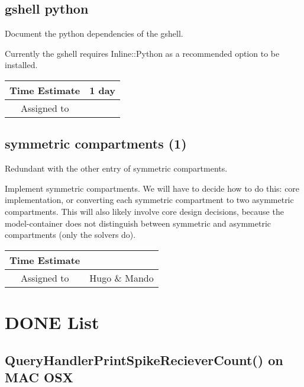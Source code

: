 \documentclass[12pt]{article}
\begin{document}
\subsection{gshell python}

Document the python dependencies of the gshell.

Currently the gshell requires Inline::Python as a recommended option
to be installed.

\begin{center}
  \vspace{5mm}
  \centering
  \begin{tabular}{|c|c|}
    \hline
    Time Estimate
    & 1 day \\
    \hline
    Assigned to
    & \\
    \hline
  \end{tabular}
\end{center}


\subsection{symmetric compartments (1)}

Redundant with the other entry of symmetric compartments.

Implement symmetric compartments.  We will have to decide how to do
this: core implementation, or converting each symmetric compartment to
two asymmetric compartments.  This will also likely involve core
design decisions, because the model-container does not distinguish
between symmetric and asymmetric compartments (only the solvers do).

\begin{center}
  \vspace{5mm}
  \centering
  \begin{tabular}{|c|c|}
    \hline
    Time Estimate
    & \\
    \hline
    Assigned to
    & Hugo \& Mando \\
    \hline
  \end{tabular}
\end{center}


\section{DONE List}


\subsection{QueryHandlerPrintSpikeRecieverCount() on MAC OSX}
\end{document}
